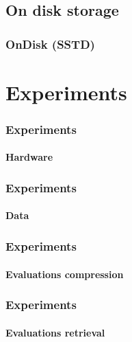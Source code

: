 \documentclass{beamer}
\begin{document}
\subsection{On disk storage}
\begin{frame}
	\frametitle{OnDisk (SSTD)}
\end{frame}

\section{Experiments}

\begin{frame}
	\frametitle{Experiments}
	\framesubtitle{Hardware}
\end{frame}

\begin{frame}
	\frametitle{Experiments}
	\framesubtitle{Data}
\end{frame}

\begin{frame}
	\frametitle{Experiments}
	\framesubtitle{Evaluations compression}
\end{frame}

\begin{frame}
	\frametitle{Experiments}
	\framesubtitle{Evaluations retrieval}
\end{frame}
\end{document}
